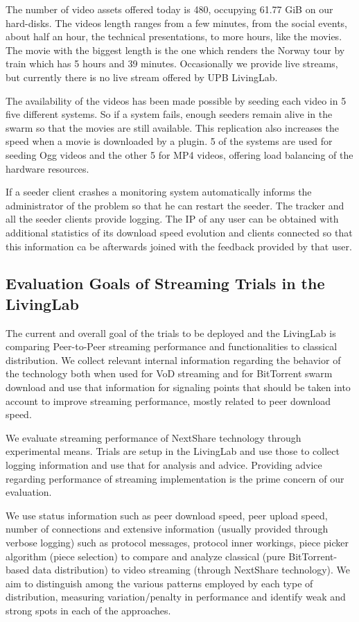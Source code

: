 The number of video assets offered today is 480, occupying 61.77 GiB on our
hard-disks. The videos length ranges from a few minutes, from the social
events, about half an hour, the technical presentations, to more hours, like
the movies. The movie with the biggest length is the one which renders the
Norway tour by train which has 5 hours and 39 minutes. Occasionally we provide
live streams, but currently there is no live stream offered by UPB LivingLab.

The availability of the videos has been made possible by seeding each video in
5 five different systems. So if a system fails, enough seeders remain alive in
the swarm so that the movies are still available. This replication also
increases the speed when a movie is downloaded by a plugin. 5 of the systems
are used for seeding Ogg videos and the other 5 for MP4 videos, offering load
balancing of the hardware resources.

If a seeder client crashes a monitoring system automatically informs the
administrator of the problem so that he can restart the seeder. The tracker
and all the seeder clients provide logging. The IP of any user can be obtained
with additional statistics of its download speed evolution and clients
connected so that this information ca be afterwards joined with the feedback
provided by that user.

\subsection{Evaluation Goals of Streaming Trials in the LivingLab}
\label{subsec:multimedia-dist:evaluation-goals}

The current and overall goal of the trials to be deployed and the LivingLab is
comparing Peer-to-Peer streaming performance and functionalities to
classical distribution. We collect relevant internal information regarding the
behavior of the technology both when used for VoD streaming and for BitTorrent
swarm download and use that information for signaling points that should be
taken into account to improve streaming performance, mostly related to peer
download speed.

We evaluate streaming performance of NextShare technology through experimental
means. Trials are setup in the LivingLab and use those to collect logging
information and use that for analysis and advice. Providing advice regarding
performance of streaming implementation is the prime concern of our
evaluation.

We use status information such as peer download speed, peer upload
speed, number of connections and extensive information (usually provided
through verbose logging) such as protocol messages, protocol inner workings,
piece picker algorithm (piece selection) to compare and analyze classical
(pure BitTorrent-based data distribution) to video streaming (through
NextShare technology). We aim to distinguish among the various patterns
employed by each type of distribution, measuring variation/penalty in
performance and identify weak and strong spots in each of the approaches.

